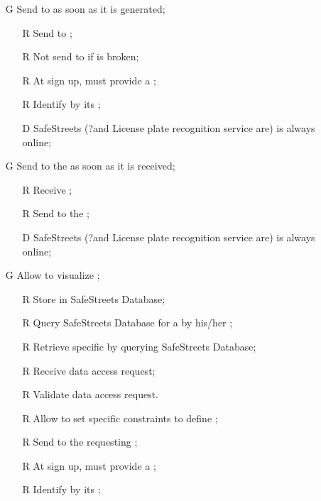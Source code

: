 \documentclass[../../../rasd.tex]{subfiles}
\begin{document}
\begin{itemize}
	\item[G\subs{2}]Send  to  as soon as it is generated;
	\begin{itemize}
		\item[R\subs{11}]Send  to ;
		\item[R\subs{15}]Not send  to  if  is broken;
		\item[R\subs{31}]At sign up,  must provide a ;
		\item[R\subs{32}]Identify  by its ;
		\\
		\item[D\subs{6}]SafeStreets (?and License plate recognition service are) is always online;	
	\end{itemize}

	\item[G\subs{3}]Send  to the  as soon as it is received;
	\begin{itemize}
		\item[R\subs{4}]Receive ;
		\item[R\subs{7}]Send  to the ;
		\\
		\item[D\subs{6}]SafeStreets (?and License plate recognition service are) is always online;
	\end{itemize}

	\item[G\subs{4}]Allow  to visualize ;
	\begin{itemize}
		\item[R\subs{10}]Store  in SafeStreets Database;
		\item[R\subs{13}]Query SafeStreets Database for a  by his/her ;
		\item[R\subs{14}]Retrieve specific  by querying SafeStreets Database;
		\item[R\subs{16}]Receive  data access request;
		\item[R\subs{17}]Validate  data access request.
		\item[R\subs{18}]Allow  to set specific constraints to define ;
		\item[R\subs{19}]Send  to the requesting ;
		\item[R\subs{31}]At sign up,  must provide a ;
		\item[R\subs{32}]Identify  by its ;
	\end{itemize}


\end{itemize}
\end{document}
